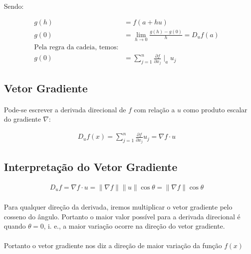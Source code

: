 \documentclass{article}
\newcommand{\PartialDer}[2] {\frac{\partial #1} {\partial #2}}
\newcommand{\norm}[1] {\left.\parallel #1 \right.\parallel}
\begin{document}
            \paragraph{}
            Sendo:

            \begin{align*}
                g(h) &= f(a + hu)\\
                g(0) &= \lim_{h \to 0} \frac{g(h) - g(0)} {h} = D_u f(a)\\      
                \text{Pela regra da cadeia, temos:}\\
                g(0) &= \sum_{j = 1}^n \PartialDer{f}{x_j} \mid_a u_j
            \end{align*}

        \subsection{Vetor Gradiente}
            \paragraph{}
            Pode-se escrever a derivada direcional de $f$ com relação a $u$ como produto escalar do gradiente $\nabla$:

            \begin{align*}
                D_u f(x) = \sum_{j = 1}^n \PartialDer{f}{x_j} u_j = \nabla f \cdot u
            \end{align*}

        \subsection{Interpretação do Vetor Gradiente}
            \begin{align*}
                D_u f = \nabla f \cdot u = \norm{\nabla f} \norm{u} \cos{\theta} = \norm{\nabla f} \cos{\theta}
            \end{align*}

            \paragraph{}
            Para qualquer direção da derivada, iremos multiplicar o vetor gradiente pelo cosseno do ângulo. Portanto o maior valor
            possível para a derivada direcional é quando $\theta = 0$, i. e., a maior variação ocorre na direção do vetor gradiente.
            \paragraph{}
            Portanto o vetor gradiente nos diz a direção de maior variação da função $f(x)$
\end{document}
